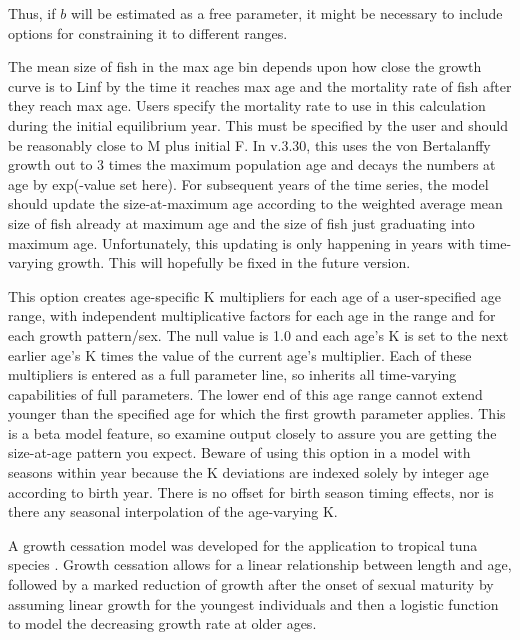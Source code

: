 Thus, if $b$ will be estimated as a free parameter, it might be necessary to include options for constraining it to different ranges.

	
The mean size of fish in the max age bin depends upon how close the growth curve is to Linf by the time it reaches max age and the mortality rate of fish after they reach max age. Users specify the mortality rate to use in this calculation during the initial equilibrium year. This must be specified by the user and should be reasonably close to M plus initial F. In v.3.30, this uses the von Bertalanffy growth out to 3 times the maximum population age and decays the numbers at age by exp(-value set here). For subsequent years of the time series, the model should update the size-at-maximum age according to the weighted average mean size of fish already at maximum age and the size of fish just graduating into maximum age. Unfortunately, this updating is only happening in years with time-varying growth. This will hopefully be fixed in the future version.
	
This option creates age-specific K multipliers for each age of a user-specified age range, with independent multiplicative factors for each age in the range and for each growth pattern/sex. The null value is 1.0 and each age's K is set to the next earlier age's K times the value of the current age's multiplier. Each of these multipliers is entered as a full parameter line, so inherits all time-varying capabilities of full parameters. The lower end of this age range cannot extend younger than the specified age for which the first growth parameter applies. This is a beta model feature, so examine output closely to assure you are getting the size-at-age pattern you expect. Beware of using this option in a model with seasons within year because the K deviations are indexed solely by integer age according to birth year. There is no offset for birth season timing effects, nor is there any seasonal interpolation of the age-varying K.

\hypertarget{GrowthCessation}{}
A growth cessation model was developed for the application to tropical tuna species \citep{maunder-growth-2018}. Growth cessation allows for a linear relationship between length and age, followed by a marked reduction of growth after the onset of sexual maturity by assuming linear growth for the youngest individuals and then a logistic function to model the decreasing growth rate at older ages.

